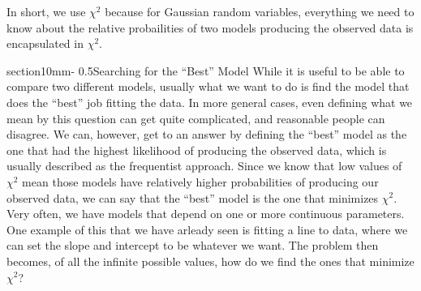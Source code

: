 \documentclass[letterpaper,11pt,preprint]{aastex}
\makeatletter
\renewcommand{\section}{\@startsection%
{section}{1}{0mm}{-\baselineskip}%
{0.5\baselineskip}{\normalfont\Large\bfseries}}%
\makeatother
\begin{document}
{In short, we use $\chi^2$ because for Gaussian random variables,
everything we need to know about the relative probailities of two
models producing the observed data is encapsulated in $\chi^2$.  

\section{Searching for the ``Best'' Model}
While it is useful to be able to compare two different models, usually
what we want to do is find the model that does the ``best'' job
fitting the data.  In more general cases, even defining what we mean
by this question can get quite complicated, and reasonable people can
disagree.  We can, however, get to an answer by defining the ``best''
model as the one that had the highest likelihood of producing the
observed data, which is usually described as the frequentist approach.
Since we know that low values of $\chi^2$ mean those models have
relatively higher probabilities of producing our observed data, we can
say that the ``best'' model is the one that minimizes $\chi^2$.  Very
often, we have models that depend on one or more continuous
parameters.  One example of this that we have arleady seen is fitting
a line to data, where we can set the slope and intercept to be
whatever we want.  The problem then becomes, of all the infinite
possible values, how do we find the ones that minimize $\chi^2$?

}
\end{document}
